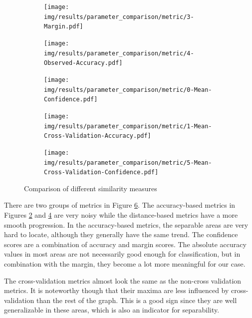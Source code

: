 \documentclass[pdftex,12pt,a4paper]{report}
\begin{document}
\begin{figure}[h]
	\centering
	\begin{subfigure}[b]{0.32\textwidth}
		\centering
		\texttt{[image: img/results/parameter\_comparison/metric/3-Margin.pdf]}
		\label{fig:metrics-0}
	\end{subfigure}
	\begin{subfigure}[b]{0.32\textwidth}
		\centering
		\texttt{[image: img/results/parameter\_comparison/metric/4-Observed-Accuracy.pdf]}
		\label{fig:metrics-1}
	\end{subfigure}
	\begin{subfigure}[b]{0.32\textwidth}
		\centering
		\texttt{[image: img/results/parameter\_comparison/metric/0-Mean-Confidence.pdf]}
		\label{fig:metrics-2}
	\end{subfigure}
	\begin{subfigure}[b]{0.32\textwidth}
		\centering
		\texttt{[image: img/results/parameter\_comparison/metric/1-Mean-Cross-Validation-Accuracy.pdf]}
		\label{fig:metrics-3}
	\end{subfigure}
	\begin{subfigure}[b]{0.32\textwidth}
		\centering
		\texttt{[image: img/results/parameter\_comparison/metric/5-Mean-Cross-Validation-Confidence.pdf]}
		\label{fig:metrics-4}
	\end{subfigure}
	\caption{Comparison of different similarity measures}
	\label{fig:metrics}
\end{figure}

There are two groups of metrics in Figure \ref{fig:metrics}. The accuracy-based metrics in Figures \ref{fig:metrics-1} and \ref{fig:metrics-3} are very noisy while the distance-based metrics have a more smooth progression. In the accuracy-based metrics, the separable areas are very hard to locate, although they generally have the same trend. The confidence scores are a combination of accuracy and margin scores. The absolute accuracy values in most areas are not necessarily good enough for classification, but in combination with the margin, they become a lot more meaningful for our case.

The cross-validation metrics almost look the same as the non-cross validation metrics. It is noteworthy though that their maxima are less influenced by cross-validation than the rest of the graph. This is a good sign since they are well generalizable in these areas, which is also an indicator for separability.
\end{document}

